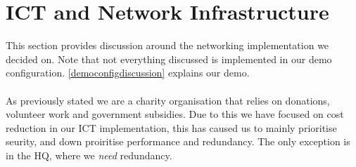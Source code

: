 
\section{ICT and Network Infrastructure}

%

This section provides discussion around the networking implementation we decided on. Note that not everything discussed is implemented in our demo configuration. \ref{democonfigdiscussion} explains our demo.
\\
\\
As previously stated we are a charity organisation that relies on donations, volunteer work and government subsidies. Due to this we have focused on cost reduction in our ICT implementation, this has caused us to mainly prioritise seurity, and down proiritise performance and redundancy. The only exception is in the HQ, where we \textit{need} redundancy.

